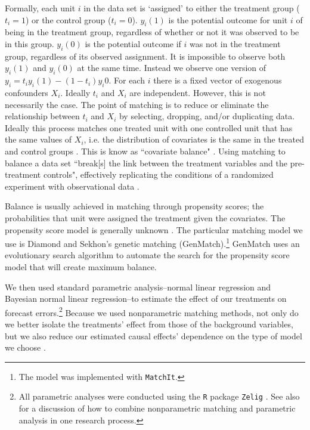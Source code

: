 \documentclass[a4paper]{article}\usepackage{graphicx, color}
\begin{document}
Formally, each unit $i$ in the data set is `assigned' to either the treatment group ($t_{i} = 1$) or the control group ($t_{i} = 0$). $y_{i}(1)$ is the potential outcome for unit $i$ of being in the treatment group, regardless of whether or not it was observed to be in this group. $y_{i}(0)$ is the potential outcome if $i$ was not in the treatment group, regardless of its observed assignment. It is impossible to observe both $y_{i}(1)$ and $y_{i}(0)$ at the same time. Instead we observe one version of $y_{i}=t_{i}y_{i}(1)-(1-t_{i})y_i{0}$. For each $i$ there is a fixed vector of exogenous confounders $X_{i}$. Ideally $t_{i}$ and $X_{i}$ are independent. However, this is not necessarily the case. The point of matching is to reduce or eliminate the relationship between $t_{i}$  and $X_{i}$ by selecting, dropping, and/or duplicating data. Ideally this process matches one treated unit with one controlled unit that has the same values of $X_{i}$, i.e. the distribution of covariates is the same in the treated and control groups \citep{matchit2011}. This is know as ``covariate balance" \cite[1]{Diamond2012}. Using matching to balance a data set ``break[s] the link between the treatment variables and the pre-treatment controls", effectively replicating the conditions of a randomized experiment with observational data \cite[][2--3]{matchit2011}. 

Balance is usually achieved in matching through propensity scores; the probabilities that unit were assigned the treatment given the covariates. The propensity score model is generally unknown \cite[1]{Diamond2012}. The particular matching model we use is Diamond and Sekhon's \citeyearpar{Diamond2012} genetic matching (GenMatch).\footnote{The model was implemented with {\tt{MatchIt}}.} GenMatch uses an evolutionary search algorithm to automate the search for the propensity score model that will create maximum balance.

We then used standard parametric analysis--normal linear regression and Bayesian normal linear regression--to estimate the effect of our treatments on forecast errors.\footnote{All parametric analyses were conducted using the {\tt{R}} package {\tt{Zelig}} \citep{Zelig2012}. See also \cite{Imai2008} for a discussion of how to combine nonparametric matching and parametric analysis in one research process.} Because we used nonparametric matching methods, not only do we better isolate the treatments' effect from those of the background variables, but we also reduce our estimated causal effects' dependence on the type of model we choose \cite[200--201]{Ho2007}.
\end{document}
